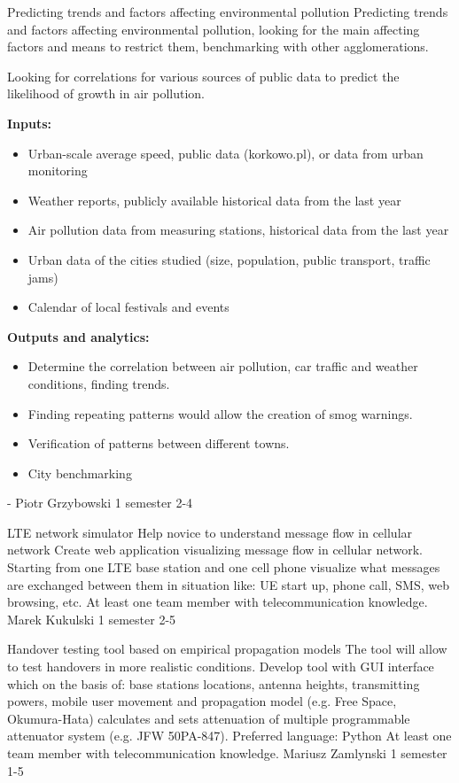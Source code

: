 \begin{project}
{Predicting trends and factors affecting environmental pollution}
{Predicting trends and factors affecting environmental pollution, looking for the main affecting factors and means to restrict them, benchmarking with other agglomerations.} 
{ 
Looking for correlations for various sources of public data to predict the likelihood of growth in air pollution.

\textbf{Inputs:}
\begin{itemize}
	\item Urban-scale average speed, public data (korkowo.pl), or data from urban monitoring
	\item Weather reports, publicly available historical data from the last year
	\item Air pollution data from measuring stations, historical data from the last year
	\item Urban data of the cities studied (size, population, public transport, traffic jams)
	\item Calendar of local festivals and events
\end{itemize} 
\textbf{Outputs and analytics:}
\begin{itemize}
	\item Determine the correlation between air pollution, car traffic and weather conditions, finding trends.
	\item Finding repeating patterns would allow the creation of smog warnings.
	\item Verification of patterns between different towns.
	\item City benchmarking
\end{itemize} 
}
{-}
{Piotr Grzybowski}
{1 semester}
{2-4}
\end{project}
\begin{project}
{LTE network simulator}
{Help novice to understand message flow in cellular network} 
{ 
Create web application visualizing message flow in cellular network. Starting
from one LTE base station and one cell phone visualize what messages are exchanged between them 
in situation like: UE start up, phone call, SMS, web browsing, etc.
}
{At least one team member with telecommunication knowledge.}
{Marek Kukulski}
{1 semester}
{2-5}
\end{project}
\begin{project}
{Handover testing tool based on empirical propagation models}
{The tool will allow to test handovers in more realistic conditions.} 
{ 
Develop tool with GUI interface which on the basis of: base stations locations, antenna heights, transmitting powers, mobile user movement and propagation model (e.g. Free Space, Okumura-Hata) calculates and sets attenuation of multiple programmable attenuator system (e.g. JFW 50PA-847).
}
{Preferred language: Python\newline
At least one team member with telecommunication knowledge.}
{Mariusz Zamlynski}
{1 semester}
{1-5}
\end{project}
